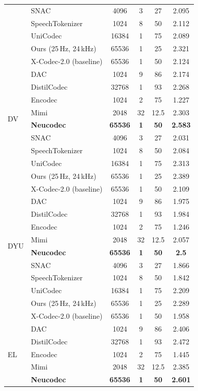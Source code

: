 \documentclass[preprint]{article}
\begin{document}
\begin{longtable}{llcccc}
  & SNAC & 4096 & 3 & 27 & 2.095 \\
  & SpeechTokenizer & 1024 & 8 & 50 & 2.112 \\
  & UniCodec & 16384 & 1 & 75 & 2.089 \\
  & Ours (25\,Hz, 24\,kHz) & 65536 & 1 & 25 & 2.321 \\
  & X-Codec-2.0 (baseline) & 65536 & 1 & 50 & 2.124 \\
\midrule
\multirow{8}{*}{DV}
  & DAC & 1024 & 9 & 86 & 2.174 \\
  & DistilCodec & 32768 & 1 & 93 & 2.268 \\
  & Encodec & 1024 & 2 & 75 & 1.227 \\
  & Mimi & 2048 & 32 & 12.5 & 2.303 \\
  & \textbf{Neucodec} & \textbf{65536} & \textbf{1} & \textbf{50} & \textbf{2.583} \\
  & SNAC & 4096 & 3 & 27 & 2.031 \\
  & SpeechTokenizer & 1024 & 8 & 50 & 2.084 \\
  & UniCodec & 16384 & 1 & 75 & 2.313 \\
  & Ours (25\,Hz, 24\,kHz) & 65536 & 1 & 25 & 2.389 \\
  & X-Codec-2.0 (baseline) & 65536 & 1 & 50 & 2.109 \\
\midrule
\multirow{8}{*}{DYU}
  & DAC & 1024 & 9 & 86 & 1.975 \\
  & DistilCodec & 32768 & 1 & 93 & 1.984 \\
  & Encodec & 1024 & 2 & 75 & 1.246 \\
  & Mimi & 2048 & 32 & 12.5 & 2.057 \\
  & \textbf{Neucodec} & \textbf{65536} & \textbf{1} & \textbf{50} & \textbf{2.5} \\
  & SNAC & 4096 & 3 & 27 & 1.866 \\
  & SpeechTokenizer & 1024 & 8 & 50 & 1.842 \\
  & UniCodec & 16384 & 1 & 75 & 2.209 \\
  & Ours (25\,Hz, 24\,kHz) & 65536 & 1 & 25 & 2.289 \\
  & X-Codec-2.0 (baseline) & 65536 & 1 & 50 & 1.958 \\
\midrule
\multirow{8}{*}{EL}
  & DAC & 1024 & 9 & 86 & 2.406 \\
  & DistilCodec & 32768 & 1 & 93 & 2.472 \\
  & Encodec & 1024 & 2 & 75 & 1.445 \\
  & Mimi & 2048 & 32 & 12.5 & 2.385 \\
  & \textbf{Neucodec} & \textbf{65536} & \textbf{1} & \textbf{50} & \textbf{2.601} \\

\end{longtable}
\end{document}
